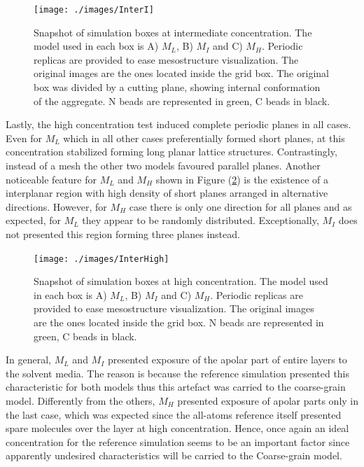 \documentclass[10pt,a4paper,twoside]{article}
\begin{document}
\begin{figure}[H]
  \begin{center}
	\texttt{[image: ./images/InterI]}
	\caption{Snapshot of simulation boxes at intermediate concentration. The model used in each box is A) $M_L$, B) $M_I$ and C) $M_H$. Periodic replicas are provided to ease mesostructure visualization. The original images are the ones located inside the grid box. The original box was divided by a cutting plane, showing internal conformation of the aggregate.  N beads are represented in green, C beads in black.}
	\label{Fig:InterI}
  \end{center}
\end{figure} 

Lastly, the high concentration test induced complete periodic planes in all cases. Even for $M_L$ which in all other cases preferentially formed short planes, at this concentration stabilized forming long planar lattice structures. Contrastingly, instead of a mesh the other two models favoured parallel planes. Another noticeable feature for $M_L$ and $M_H$ shown in Figure (\ref{Fig:InterHigh}) is the existence of a interplanar region with high density of short planes arranged in alternative directions. However, for $M_H$ case there is only one direction for all planes and as expected, for $M_L$  they appear to be randomly distributed. Exceptionally, $M_I$ does not presented this region forming three planes instead. 

\begin{figure}[H]
  \begin{center}
	\texttt{[image: ./images/InterHigh]}
	\caption{Snapshot of simulation boxes at high concentration. The model used in each box is A) $M_L$, B) $M_I$ and C) $M_H$. Periodic replicas are provided to ease mesostructure visualization. The original images are the ones located inside the grid box.  N beads are represented in green, C beads in black.}
	\label{Fig:InterHigh}
  \end{center}
\end{figure} 

In general, $M_L$ and $M_I$ presented exposure of the apolar part of entire layers to the solvent media. The reason is because the reference simulation presented this characteristic for both models thus this artefact was carried to the coarse-grain model. Differently from the others, $M_H$ presented exposure of apolar parts only in the last case, which was expected since the all-atoms reference itself presented spare molecules over the layer at high concentration. Hence, once again an ideal concentration for the reference simulation seems to be an important factor since apparently undesired characteristics will be carried to the Coarse-grain model.
\end{document}
